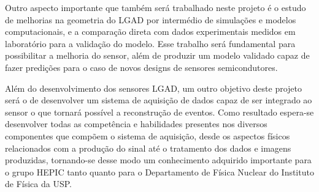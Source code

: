 Outro aspecto importante que também será trabalhado neste projeto é o estudo de melhorias na geometria do LGAD por intermédio de simulações e modelos computacionais, e a comparação direta com dados experimentais medidos em laboratório para a validação do modelo. Esse trabalho será fundamental para possibilitar a melhoria do sensor, além de produzir um modelo validado capaz de fazer predições para o caso de novos designs de sensores semicondutores. 

Além do desenvolvimento dos sensores LGAD, um outro objetivo deste projeto será o de desenvolver um sistema de aquisição de dados capaz de ser integrado ao sensor o que tornará possível a reconstrução de eventos. Como resultado espera-se desenvolver todas as competência e habilidades presentes nos diversos componentes que compõem o sistema de aquisição, desde os aspectos físicos relacionados com a produção do sinal até o tratamento dos dados e imagens produzidas, tornando-se desse modo um conhecimento adquirido importante para o grupo HEPIC tanto quanto para o Departamento de Física Nuclear do Instituto de Física da USP.


\renewcommand{\cleardoublepage}{}
\renewcommand{\clearpage}{}